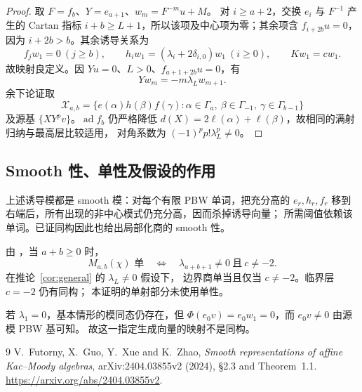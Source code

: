 \documentclass[UTF8,11pt]{ctexart}
\newcommand{\ad}{\operatorname{ad}}
\theoremstyle{definition}
\begin{document}
\begin{proof}
取 \(F=f_b\)、\(Y=e_{a+1}\)、\(w_m=F^{-m}u+M\)。
对 \(i\ge a+2\)，交换 \(e_i\) 与 \(F^{-1}\) 产生的 Cartan 指标
\(i+b\ge L+1\)，所以该项及中心项为零；其余项含 \(f_{i+2b}u=0\)，
因为 \(i+2b>b\)。其余诱导关系为
\[
 f_jw_1=0\ (j\ge b),\qquad
 h_iw_1=(\lambda_i+2\delta_{i,0})w_1\ (i\ge0),\qquad Kw_1=cw_1.
\]
故映射良定义。因 \(Yu=0\)、\(L>0\)、\(f_{a+1+2b}u=0\)，有
\[
 Yw_m=-m\lambda_Lw_{m+1}.
\]
余下论证取
\[
 \mathcal X_{a,b}=\{e(\alpha)h(\beta)f(\gamma):
      \alpha\in\Gamma_a,\ \beta\in\Gamma_{-1},\ \gamma\in\Gamma_{b-1}\}
\]
及源基 \(\{XY^pv\}\)。\(\ad f_b\) 仍严格降低
\(d(X)=2\ell(\alpha)+\ell(\beta)\)，故相同的满射归纳与最高层比较适用，
对角系数为 \((-1)^pp!\lambda_L^p\ne0\)。
\end{proof}

\subsection{Smooth 性、单性及假设的作用}

上述诱导模都是 smooth 模：对每个有限 PBW 单词，把充分高的
\(e_r,h_r,f_r\) 移到右端后，所有出现的非中心模式仍充分高，因而杀掉诱导向量；
所需阈值依赖该单词。已证同构因此也给出局部化商的 smooth 性。

由 \cite[Theorem~1.1]{FGXZ}，当 \(a+b\ge0\) 时，
\[
 M_{a,b}(\chi)\text{ 单}\quad\Longleftrightarrow\quad
 \lambda_{a+b+1}\ne0\ \text{且}\ c\ne-2.
\]
在推论~\ref{cor:general} 的 \(\lambda_L\ne0\) 假设下，
边界商单当且仅当 \(c\ne-2\)。临界层 \(c=-2\) 仍有同构；
本证明的单射部分未使用单性。

若 \(\lambda_1=0\)，基本情形的模同态仍存在，但
\(\Phi(e_0v)=e_0w_1=0\)，而 \(e_0v\ne0\) 由源模 PBW 基可知。
故这一指定生成向量的映射不是同构。

\begin{thebibliography}{9}
V.~Futorny, X.~Guo, Y.~Xue and K.~Zhao,
\emph{Smooth representations of affine Kac--Moody algebras},
arXiv:2404.03855v2 (2024), \S2.3 and Theorem~1.1.
\url{https://arxiv.org/abs/2404.03855v2}.
\end{thebibliography}
\end{document}
